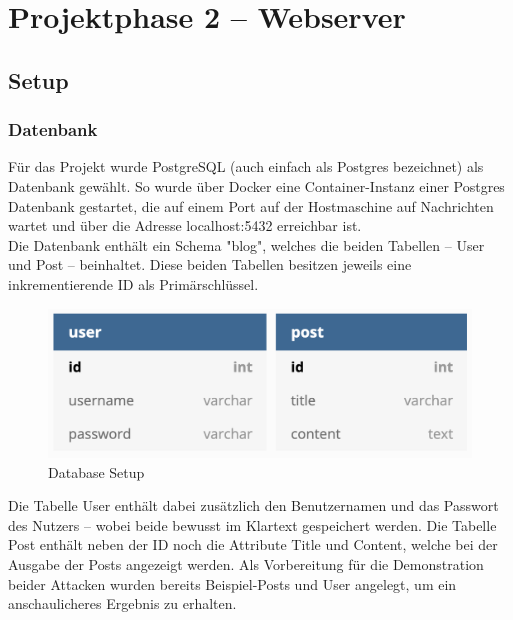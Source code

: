 \chapter{Projektphase 2 – Webserver}
\section{Setup}
\subsection{Datenbank}
Für das Projekt wurde PostgreSQL (auch einfach als Postgres bezeichnet) als Datenbank gewählt. So wurde über Docker eine Container-Instanz einer Postgres Datenbank gestartet, die auf einem Port auf der Hostmaschine auf Nachrichten wartet und über die Adresse localhost:5432 erreichbar ist. \\
Die Datenbank enthält ein Schema "blog", welches die beiden Tabellen – User und Post – beinhaltet. Diese beiden Tabellen besitzen jeweils eine inkrementierende ID als Primärschlüssel. 

\begin{figure}
    \includegraphics[width=\linewidth]{img/database.png}
    \caption{Database Setup}
    \label{fig:database}
\end{figure}

Die Tabelle User enthält dabei zusätzlich den Benutzernamen und das Passwort des Nutzers – wobei beide bewusst im Klartext gespeichert werden. 
Die Tabelle Post enthält neben der ID noch die Attribute Title und Content, welche bei der Ausgabe der Posts angezeigt werden. 
Als Vorbereitung für die Demonstration beider Attacken wurden bereits Beispiel-Posts und User angelegt, um ein anschaulicheres Ergebnis zu erhalten.
\pagebreak
